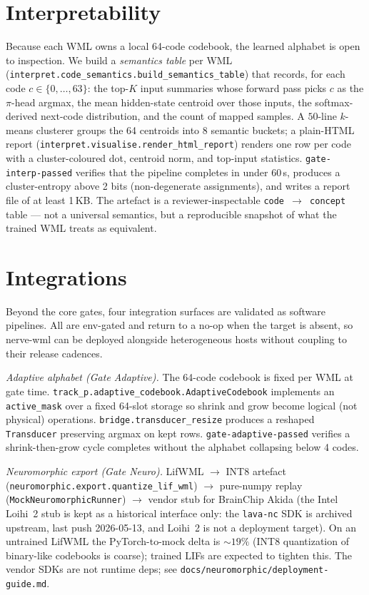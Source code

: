 \documentclass[10pt,twocolumn]{article}
\begin{document}
\section{Interpretability}
\label{sec:interp}

Because each WML owns a local 64-code codebook, the learned alphabet
is open to inspection. We build a \emph{semantics table} per WML
(\texttt{interpret.code\_semantics.build\_semantics\_table}) that
records, for each code $c \in \{0, \dots, 63\}$: the top-$K$ input
summaries whose forward pass picks $c$ as the $\pi$-head argmax, the
mean hidden-state centroid over those inputs, the softmax-derived
next-code distribution, and the count of mapped samples. A $50$-line
$k$-means clusterer groups the 64 centroids into 8 semantic buckets;
a plain-HTML report (\texttt{interpret.visualise.render\_html\_report})
renders one row per code with a cluster-coloured dot, centroid norm,
and top-input statistics. \texttt{gate-interp-passed} verifies that
the pipeline completes in under 60\,s, produces a cluster-entropy
above 2 bits (non-degenerate assignments), and writes a report file
of at least 1\,KB. The artefact is a reviewer-inspectable
\texttt{code\,$\to$\,concept} table --- not a universal semantics, but
a reproducible snapshot of what the trained WML treats as equivalent.

\section{Integrations}
\label{sec:integrations}

Beyond the core gates, four integration surfaces are validated as software
pipelines. All are env-gated and return to a no-op when the target is absent,
so nerve-wml can be deployed alongside heterogeneous hosts without coupling
to their release cadences.

\textit{Adaptive alphabet (Gate Adaptive).}
The 64-code codebook is fixed per WML at gate time.
\texttt{track\_p.adaptive\_codebook.AdaptiveCodebook} implements an
\texttt{active\_mask} over a fixed 64-slot storage so shrink and grow
become logical (not physical) operations. \texttt{bridge.transducer\_resize}
produces a reshaped \texttt{Transducer} preserving argmax on kept rows.
\texttt{gate-adaptive-passed} verifies a shrink-then-grow cycle completes
without the alphabet collapsing below 4 codes.

\textit{Neuromorphic export (Gate Neuro).} LifWML $\to$ INT8 artefact
(\texttt{neuromorphic.export.quantize\_lif\_wml}) $\to$ pure-numpy
replay (\texttt{MockNeuromorphicRunner}) $\to$ vendor stub for
BrainChip Akida (the Intel Loihi~2 stub is kept as a historical
interface only: the \texttt{lava-nc} SDK is archived upstream, last
push 2026-05-13, and Loihi~2 is not a deployment target). On an
untrained LifWML the
PyTorch-to-mock delta is $\sim 19\%$ (INT8 quantization of binary-like
codebooks is coarse); trained LIFs are expected to tighten this.
The vendor SDKs are not runtime deps; see
\texttt{docs/neuromorphic/deployment-guide.md}.
\end{document}
